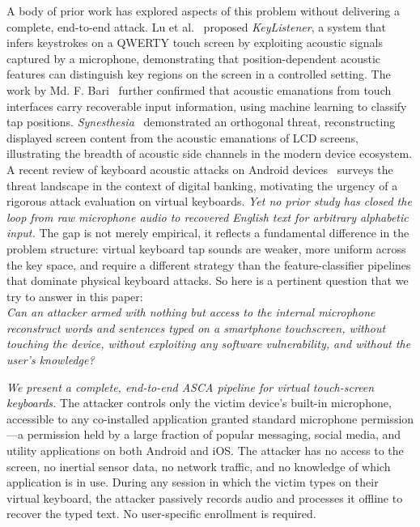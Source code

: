 \documentclass[conference]{IEEEtran}
\begin{document}
A body of prior work has explored aspects of this problem without delivering a complete, end-to-end attack. Lu et al.~\cite{lu2019keylistener} proposed \textit{KeyListener}, a system that infers keystrokes on a QWERTY touch screen by exploiting acoustic signals captured by a microphone, demonstrating that position-dependent acoustic features can distinguish key regions on the screen in a controlled setting. The work by Md. F. Bari~\cite{ieee2021touch} further confirmed that acoustic emanations from touch interfaces carry recoverable input information, using machine learning to classify tap positions. \textit{Synesthesia}~\cite{genkin2019synesthesia} demonstrated an orthogonal threat, reconstructing displayed screen content from the acoustic emanations of LCD screens, illustrating the breadth of acoustic side channels in the modern device ecosystem. A recent review of keyboard acoustic attacks on Android devices~\cite{android2023} surveys the threat landscape in the context of digital banking, motivating the urgency of a rigorous attack evaluation on virtual keyboards.  \emph{Yet no prior study has closed the loop from raw microphone audio to recovered English
text for arbitrary alphabetic input.} The gap is not merely empirical, it reflects a fundamental difference in the problem structure: virtual keyboard tap sounds are weaker, more uniform across the key space, and require a different strategy than the
feature-classifier pipelines that dominate physical keyboard attacks. So here is a pertinent question that we try to answer in this paper:
\\
\noindent\textit{Can an attacker armed with nothing but access to the internal microphone reconstruct words and sentences typed on a smartphone
touchscreen, without touching the device, without exploiting
any software vulnerability, and without the user's knowledge?}

\emph{We present a complete, end-to-end ASCA pipeline for virtual touch-screen keyboards.} The attacker controls only the victim device's built-in microphone,
accessible to any co-installed application granted standard microphone
permission---a permission held by a large fraction of popular messaging,
social media, and utility applications on both Android and iOS. The
attacker has no access to the screen, no inertial sensor data, no network
traffic, and no knowledge of which application is in use. During any
session in which the victim types on their virtual keyboard, the attacker
passively records audio and processes it offline to recover the typed text.
No user-specific enrollment is required.
\end{document}
